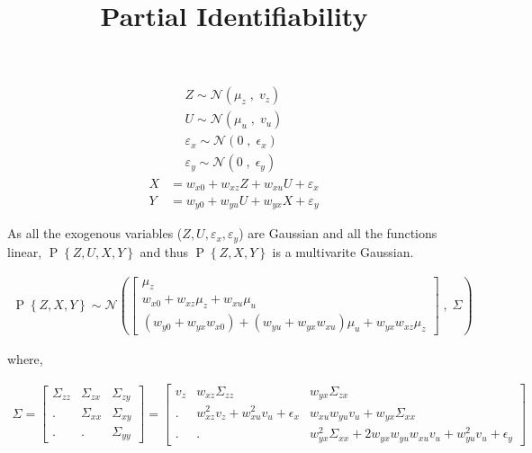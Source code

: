 \documentclass{article}
\title{Partial Identifiability}
\newcommand{\eq}[1]{\begin{align*}#1\end{align*}}
\renewcommand{\P}[1]{\operatorname{P}\left\{#1\right\}}
\newcommand{\N}[2]{\mathcal{N}\left({#1}\;,\;{#2}\right)}
\theoremstyle{plain}
\theoremstyle{definition}
\begin{document}
\def\ci{\perp\!\!\!\perp}


\begin{figure}[H]
	\centering    
\end{figure}

\eq{
Z \sim \N{\mu_z}{v_z}\\
U \sim \N{\mu_u}{v_u}\\
\varepsilon_x \sim \N{0}{\epsilon_x}\\
\varepsilon_y \sim \N{0}{\epsilon_y}}
\eq{
X &=  w_{x0} + w_{xz}Z + w_{xu}U + \varepsilon_x \\
Y &= w_{y0}+w_{yu}U+w_{yx}X+\varepsilon_y
}

As all the exogenous variables ($Z,U,\varepsilon_x, \varepsilon_y$) are Gaussian and all the functions linear, $\P{Z,U,X,Y}$ and thus  $\P{Z,X,Y}$ is a multivarite Gaussian.

\eq{
\P{Z,X,Y} \sim \N{\begin{bmatrix}
\mu_z\\
w_{x0}+w_{xz} \mu_z+w_{xu}\mu_u\\
(w_{y0}+w_{yx} w_{x0})+(w_{yu}+w_{yx}w_{xu})\mu_u + w_{yx}w_{xz}\mu_z
\end{bmatrix}}
{\Sigma}
}

where,

\eq{
\Sigma = \begin{bmatrix}
\Sigma_{zz} & \Sigma_{zx} & \Sigma_{zy} \\
. & \Sigma_{xx} & \Sigma_{xy} \\
. & . & \Sigma_{yy}
\end{bmatrix} = \begin{bmatrix}
v_z & w_{xz}\Sigma_{zz} & w_{yx}\Sigma_{zx} \\
. & w_{xz}^2 v_z+w_{xu}^2 v_u +\epsilon_x & w_{xu}w_{yu}v_u +w_{yx}\Sigma_{xx} \\
. & . &w_{yx}^2\Sigma_{xx} +2w_{yx}w_{yu}w_{xu}v_u +w_{yu}^2 v_u+\epsilon_y
\end{bmatrix}
}
\end{document}
